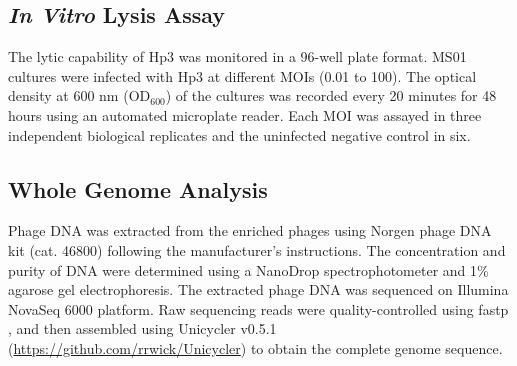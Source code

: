 \subsection{\texorpdfstring{\emph{In Vitro} Lysis
Assay}{\emph{In Vitro} Lysis Assay}}\label{in-vitro-lysis-assay}

The lytic capability of Hp3 was monitored in a 96-well plate format.
MS01 cultures were infected with Hp3 at different MOIs (0.01 to 100).
The optical density at 600 nm (\(\mathrm{OD}_{600}\)) of the cultures
was recorded every 20 minutes for 48 hours using an automated microplate
reader. Each MOI was assayed in three independent biological replicates and the
uninfected negative control in six.

\subsection{Whole Genome Analysis}\label{whole-genome-analysis}

Phage DNA was extracted from the enriched phages using Norgen phage DNA
kit (cat. 46800) following the manufacturer's instructions. The concentration
and purity of DNA were determined using a NanoDrop spectrophotometer and
1\% agarose gel electrophoresis. The extracted phage DNA was sequenced
on Illumina NovaSeq 6000 platform. Raw sequencing reads were
quality-controlled using fastp \citep{2018-Fastp_Chen}, and then
assembled using Unicycler v0.5.1
(\url{https://github.com/rrwick/Unicycler}) to obtain the complete
genome sequence.

